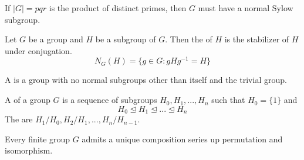 \documentclass{article}
\begin{document}
\begin{prop}
  If $|G| = pqr$ is the product of distinct primes, then $G$ must have a normal
  Sylow subgroup. 
\end{prop}

\begin{defn}
  Let $G$ be a group and $H$ be a subgroup of $G$. Then the  of $H$
  is the stabilizer of $H$ under conjugation.
  $$N_G(H) = \{g \in G : gHg^{-1} = H\}$$
\end{defn}

\begin{defn}
  A  is a group with no normal subgroups other than itself and
  the trivial group.
\end{defn}

\begin{defn}
  A  of a group $G$ is a sequence of subgroups $H_0, H_1, ..., H_n$
  such that $H_0 = \{1\}$ and
  $$H_0 \trianglelefteq H_1 \trianglelefteq ... \trianglelefteq H_n$$
  The  are $H_1/H_0, H_2/H_1, ..., H_n/H_{n-1}$.
\end{defn}

\begin{nthm}
  Every finite group $G$ admits a unique composition series up permutation and isomorphism. 
\end{nthm}
\end{document}
